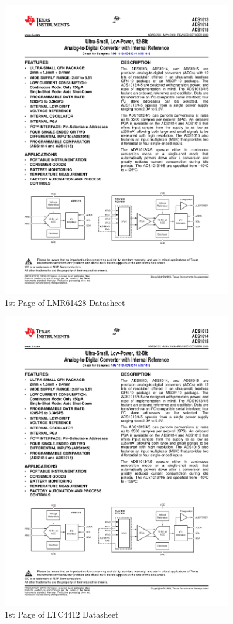 \documentclass{article}
\begin{document}
{\begin{figure}[H]
	\centering
	\includegraphics[page=8,width=0.9\textwidth]{combined.pdf}
	\caption{1st Page of LMR61428 Datasheet}
	\label{fig:lmrdat}
\end{figure}

\begin{figure}[H]
	\centering
	\includegraphics[page=9,width=0.9\textwidth]{combined.pdf}
	\caption{1st Page of LTC4412 Datasheet}
	\label{fig:ltc4412dat}
\end{figure}

}
\end{document}
